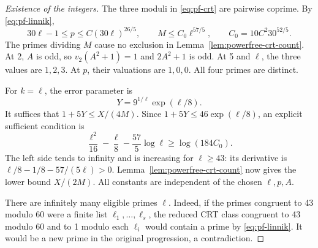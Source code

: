 \begin{proof}[Existence of the integers]
The three moduli in \eqref{eq:pf-crt} are pairwise coprime. By
\eqref{eq:pf-linnik},
\[
 30\ell-1\le p\le C(30\ell)^{26/5},\qquad
 M\le C_0\ell^{57/5},\qquad C_0=10C^2 30^{52/5}.
\]
The primes dividing \(M\) cause no exclusion in
Lemma~\ref{lem:powerfree-crt-count}. At 2, \(A\) is odd, so
\(v_2(A^2+1)=1\) and \(2A^2+1\) is odd. At 5 and \(\ell\), the three
values are \(1,2,3\). At \(p\), their valuations are \(1,0,0\).
All four primes are distinct.

For \(k=\ell\), the error parameter is
\[
 Y=9^{1/\ell}\exp(\ell/8).
\]
It suffices that \(1+5Y\le X/(4M)\). Since
\(1+5Y\le46\exp(\ell/8)\), an explicit sufficient condition is
\begin{equation}\label{eq:pf-threshold}
 \frac{\ell^2}{16}-\frac{\ell}{8}
       -\frac{57}{5}\log\ell\ge\log(184C_0).
\end{equation}
The left side tends to infinity and is increasing for \(\ell\ge43\):
its derivative is \(\ell/8-1/8-57/(5\ell)>0\).
Lemma~\ref{lem:powerfree-crt-count} now gives the lower bound \(X/(2M)\).
All constants are independent of the chosen \(\ell,p,A\).

There are infinitely many eligible primes \(\ell\). Indeed, if the primes
congruent to 43 modulo 60 were a finite list \(\ell_1,\ldots,\ell_s\),
the reduced CRT class congruent to 43 modulo 60 and to 1 modulo each
\(\ell_i\) would contain a prime by \eqref{eq:pf-linnik}. It would be a
new prime in the original progression, a contradiction.
\end{proof}

